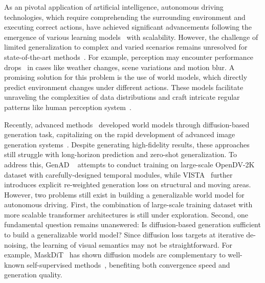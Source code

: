 As an pivotal application of artificial intelligence, autonomous driving technologies, which require comprehending the surrounding environment and executing correct actions, have achieved significant advancements following the emergence of various learning models~\cite{li2022bevformer,hu2023planning} with scalability. 
However, the challenge of limited generalization to complex and varied scenarios remains unresolved for state-of-the-art methods~\cite{li2024ego}.
For example, perception may encounter performance drops~\cite{xie2024benchmarking} in cases like weather changes, scene variations and motion blur.
A promising solution for this problem is the use of world models, which directly predict environment changes under different actions. These models facilitate unraveling the complexities of data distributions and craft intricate regular patterns like human perception system~\cite{lecun2022path}.

Recently, advanced methods~\cite{genad,vista,gaia1,drive-wm,drivedreamer,drivedreamer2,drivescape} developed world models through diffusion-based generation task, capitalizing on the rapid development of advanced image generation systems~\cite{sd3,sd,svd}. 
Despite generating high-fidelity results, these approaches still struggle with long-horizon prediction and zero-shot generalization. To address this, GenAD ~\cite{genad} attempts to conduct training on large-scale OpenDV-2K~\cite{genad} dataset with carefully-designed temporal modules, while VISTA~\cite{vista} further introduces explicit re-weighted generation loss on structural and moving areas. 
However, two problems still exist in building a generalizable world model for autonomous driving. First, the combination of large-scale training dataset with more scalable transformer architectures is still under exploration. Second, one fundamental question remains unanswered: Is diffusion-based generation sufficient to build a generalizable world model? Since diffusion loss targets at iterative de-noising, the learning of visual semantics may not be straightforward. For example, MaskDiT~\cite{maskdit} has shown diffusion models are complementary to well-known self-supervised methods~\cite{mae}, benefiting both convergence speed and generation quality.




